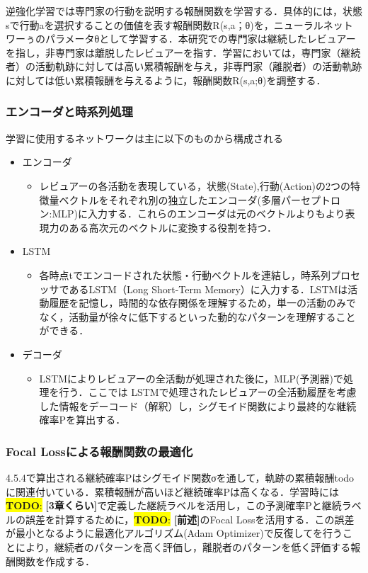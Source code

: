 \documentclass[submit,techrep,noauthor]{ipsj}
\newcommand{\todo}[1]{\colorbox{yellow}{{\bf TODO}:}{\color{red} {\textbf{[#1]}}}}
\begin{document}
逆強化学習では専門家の行動を説明する報酬関数を学習する．具体的には，状態sで行動aを選択することの価値を表す報酬関数R(s,a；θ)を，ニューラルネットワーぅのパラメータθとして学習する．本研究での専門家は継続したレビュアーを指し，非専門家は離脱したレビュアーを指す．学習においては，専門家（継続者）の活動軌跡に対しては高い累積報酬を与え，非専門家（離脱者）の活動軌跡に対しては低い累積報酬を与えるように，報酬関数R(s,a;θ)を調整する．



\subsubsection{エンコーダと時系列処理}
学習に使用するネットワークは主に以下のものから構成される
\begin{itemize}
    \item エンコーダ
    \begin{itemize}
        \item レビュアーの各活動を表現している，状態(State),行動(Action)の2つの特徴量ベクトルをそれぞれ別の独立したエンコーダ(多層パーセプトロン:MLP)に入力する．これらのエンコーダは元のベクトルよりもより表現力のある高次元のベクトルに変換する役割を持つ．
    \end{itemize}
    \item LSTM
        \begin{itemize}
    \item 各時点tでエンコードされた状態・行動ベクトルを連結し，時系列プロセッサであるLSTM（Long Short-Term Memory）に入力する．LSTMは活動履歴を記憶し，時間的な依存関係を理解するため，単一の活動のみでなく，活動量が徐々に低下するといった動的なパターンを理解することができる．
    \end{itemize}
    \item デコーダ
    \begin{itemize}
        \item  LSTMによりレビュアーの全活動が処理された後に，MLP(予測器)で処理を行う．ここでは LSTMで処理されたレビュアーの全活動履歴を考慮した情報をデーコード（解釈）し，シグモイド関数により最終的な継続確率Pを算出する．
    \end{itemize}
\end{itemize}
\subsubsection{Focal Lossによる報酬関数の最適化}
4.5.4で算出される継続確率Pはシグモイド関数σを通して，軌跡の累積報酬todoに関連付いている．累積報酬が高いほど継続確率Pは高くなる．学習時には\todo{3章くらい}で定義した継続ラベルを活用し，この予測確率Pと継続ラベルの誤差を計算するために，\todo{前述}のFocal Lossを活用する．この誤差が最小となるように最適化アルゴリズム(Adam Optimizer)で反復してを行うことにより，継続者のパターンを高く評価し，離脱者のパターンを低く評価する報酬関数を作成する．
\end{document}
